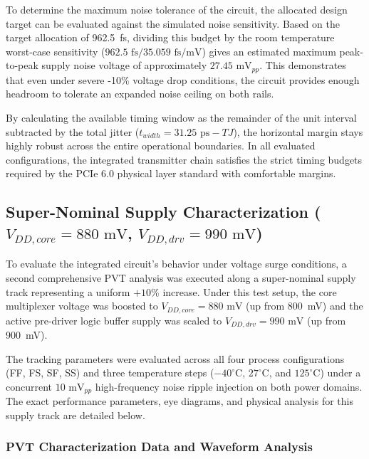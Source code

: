To determine the maximum noise tolerance of the circuit, the allocated design target can be evaluated against the simulated noise sensitivity. Based on the target allocation of 962.5~fs, dividing this budget by the room temperature worst-case sensitivity ($962.5\text{ fs} / 35.059\text{ fs/mV}$) gives an estimated maximum peak-to-peak supply noise voltage of approximately $27.45\text{ mV}_{pp}$. This demonstrates that even under severe -10\% voltage drop conditions, the circuit provides enough headroom to tolerate an expanded noise ceiling on both rails. 

By calculating the available timing window as the remainder of the unit interval subtracted by the total jitter ($t_{width} = 31.25\text{ ps} - TJ$), the horizontal margin stays highly robust across the entire operational boundaries. In all evaluated configurations, the integrated transmitter chain satisfies the strict timing budgets required by the PCIe 6.0 physical layer standard with comfortable margins.


\subsection*{Super-Nominal Supply Characterization ($V_{DD,core} = 880\text{ mV}$, $V_{DD,drv} = 990\text{ mV}$)}
\label{subsec:mux_predriver_supernominal}

To evaluate the integrated circuit's behavior under voltage surge conditions, a second comprehensive PVT analysis was executed along a super-nominal supply track representing a uniform $+10\%$ increase. Under this test setup, the core multiplexer voltage was boosted to $V_{DD,core} = 880\text{ mV}$ (up from 800~mV) and the active pre-driver logic buffer supply was scaled to $V_{DD,drv} = 990\text{ mV}$ (up from 900~mV). 

The tracking parameters were evaluated across all four process configurations (FF, FS, SF, SS) and three temperature steps ($-40^{\circ}\text{C}$, $27^{\circ}\text{C}$, and $125^{\circ}\text{C}$) under a concurrent $10\text{ mV}_{pp}$ high-frequency noise ripple injection on both power domains. The exact performance parameters, eye diagrams, and physical analysis for this supply track are detailed below.

\subsubsection*{PVT Characterization Data and Waveform Analysis}

